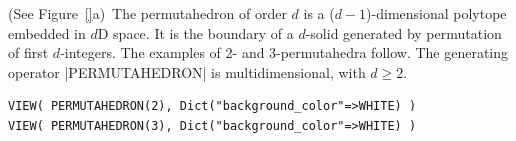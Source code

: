 \begin{coding}[Algebraic computation of FE = $\delta_1$]
\begin{condition}[($d$-Permutahedron] (See Figure~\ref{}a)\ 
The permutahedron of order $d$ is a ($d−1$)-dimensional polytope embedded in $d$D space. It is the boundary of a $d$-solid generated by permutation of first $d$-integers. The examples of 2- and 3-permutahedra follow. The generating operator |PERMUTAHEDRON| is multidimensional, with $d\geq 2$.
\begin{lstlisting}[language=JuliaLocal, style=julia, mathescape=true]
VIEW( PERMUTAHEDRON(2), Dict("background_color"=>WHITE) )
VIEW( PERMUTAHEDRON(3), Dict("background_color"=>WHITE) )
\end{lstlisting}
\end{condition}


%
%


\end{coding}
